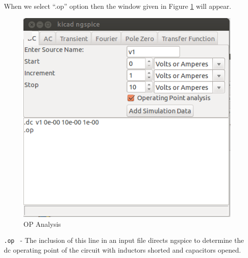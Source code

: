 When we select “.op” option then the window given in Figure \ref{3} will appear.
\begin{figure}
\centering
\includegraphics[width=\textwidth]{figures/3}
\caption{OP Analysis}
\label{3}
\end{figure}
{\tt .op } - The inclusion of this line in an input file directs ngspice to determine the dc operating point of the circuit with inductors shorted and capacitors opened. 
